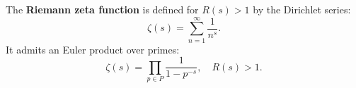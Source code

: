 The \textbf{Riemann zeta function} is defined for $R(s) > 1$ by the Dirichlet series:
$$
\zeta(s) = \sum_{n=1}^\infty \frac{1}{n^s}.
$$
It admits an Euler product over primes:
$$
\zeta(s) = \prod_{p \in P} \frac{1}{1 - p^{-s}}, \quad R(s) > 1.
$$
